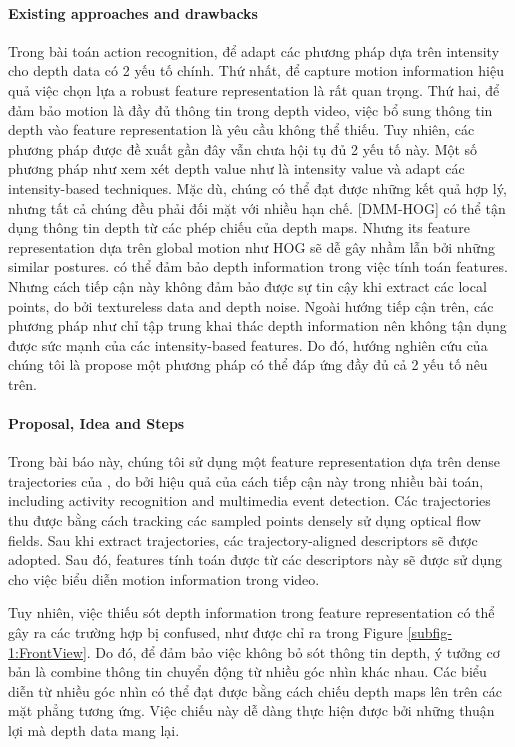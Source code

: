 \documentclass[review]{elsarticle}
\begin{document}
\paragraph{Existing approaches and drawbacks} Trong bài toán action recognition, để adapt các phương pháp dựa trên intensity cho depth data có 2 yếu tố chính. Thứ nhất, để capture motion information hiệu quả việc chọn lựa a robust feature representation là rất quan trọng. Thứ hai, để đảm bảo motion là đầy đủ thông tin trong depth video, việc bổ sung thông tin depth vào feature representation là yêu cầu không thể thiếu. Tuy nhiên, các phương pháp được đề xuất gần đây vẫn chưa hội tụ đủ 2 yếu tố này. Một số phương pháp như \cite{yang2012recognizing, xia2013spatio} xem xét depth value như là intensity value và adapt các intensity-based techniques. Mặc dù, chúng có thể đạt được những kết quả hợp lý, nhưng tất cả chúng đều phải đối mặt với nhiều hạn chế. [DMM-HOG] có thể tận dụng thông tin depth từ các phép chiếu của depth maps. Nhưng its feature representation dựa trên global motion như HOG sẽ dễ gây nhầm lẫn bởi những similar postures. \cite{xia2013spatio} có thể đảm bảo depth information trong việc tính toán features. Nhưng cách tiếp cận này không đảm bảo được sự tin cậy khi extract các local points, do bởi textureless data and depth noise. Ngoài hướng tiếp cận trên, các phương pháp như \cite{wang2012mining, oreifej2013hon4d} chỉ tập trung khai thác depth information nên không tận dụng được sức mạnh của các intensity-based features. Do đó, hướng nghiên cứu của chúng tôi là propose một phương pháp có thể đáp ứng đầy đủ cả 2 yếu tố nêu trên.

\paragraph{Proposal, Idea and Steps}Trong bài báo này, chúng tôi sử dụng một feature representation dựa trên dense trajectories của \cite{wang2011densetraj}, do bởi hiệu quả của cách tiếp cận này trong nhiều bài toán, including activity recognition and multimedia event detection. Các trajectories thu được bằng cách tracking các sampled points densely sử dụng optical flow fields. Sau khi extract trajectories, các trajectory-aligned descriptors sẽ được adopted. Sau đó, features tính toán được từ các descriptors này sẽ được sử dụng cho việc biểu diễn motion information trong video.

Tuy nhiên, việc thiếu sót depth information trong feature representation có thể gây ra các trường hợp bị confused, như được chỉ ra trong Figure \ref{subfig-1:FrontView}. Do đó, để đảm bảo việc không bỏ sót thông tin depth, ý tưởng cơ bản là combine thông tin chuyển động từ nhiều góc nhìn khác nhau. Các biểu diễn từ nhiều góc nhìn có thể đạt được bằng cách chiếu depth maps lên trên các mặt phẳng tương ứng. Việc chiếu này dễ dàng thực hiện được bởi những thuận lợi mà depth data mang lại.
\end{document}
